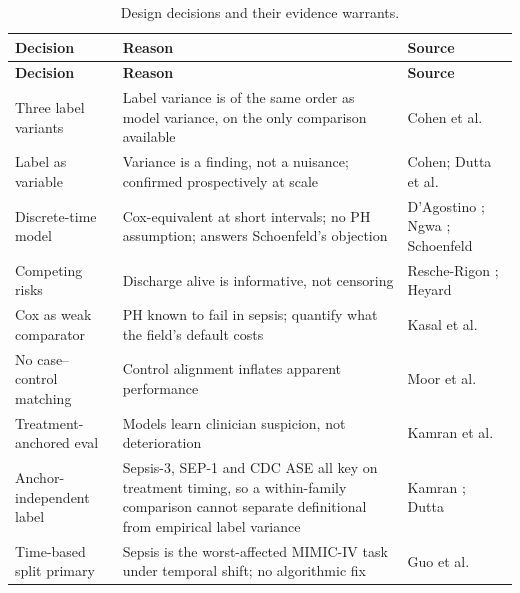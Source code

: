 {\small
\begin{longtable}{p{3.1cm}p{5.6cm}p{4cm}}
    \caption{Design decisions and their evidence warrants.}\label{tab:design_warrant}\\
    \toprule
    \textbf{Decision} & \textbf{Reason} & \textbf{Source} \\
    \midrule
    \endfirsthead
    \toprule
    \textbf{Decision} & \textbf{Reason} & \textbf{Source} \\
    \midrule
    \endhead
    \bottomrule
    \endfoot

        Three label variants & Label variance is of the same order as model
        variance, on the only comparison available &
        Cohen et al.\ \cite{cohen2024subtle} \\
        Label as variable & Variance is a finding, not a nuisance; confirmed
        prospectively at scale &
        Cohen; Dutta et al.\ \cite{dutta2026performance} \\
        Discrete-time model & Cox-equivalent at short intervals; no PH
        assumption; answers Schoenfeld's objection &
        D'Agostino \cite{dagostino1990pooled};
        Ngwa \cite{ngwa2016comparison};
        Schoenfeld \cite{schoenfeld2006survival} \\
        Competing risks & Discharge alive is informative, not censoring &
        Resche-Rigon \cite{rescherigon2006competing};
        Heyard \cite{heyard2019dynamic} \\
        Cox as weak comparator & PH known to fail in sepsis; quantify what the
        field's default costs &
        Kasal et al.\ \cite{kasal2004cox} \\
        No case--control matching & Control alignment inflates apparent
        performance &
        Moor et al.\ \cite{moor2021review} \\
        Treatment-anchored eval & Models learn clinician suspicion, not
        deterioration &
        Kamran et al.\ \cite{kamran2024evaluation} \\
        Anchor-independent label & Sepsis-3, SEP-1 and CDC ASE all key on
        treatment timing, so a within-family comparison cannot separate
        definitional from empirical label variance &
        Kamran \cite{kamran2024evaluation};
        Dutta \cite{dutta2026performance} \\
        Time-based split primary & Sepsis is the worst-affected MIMIC-IV task
        under temporal shift; no algorithmic fix &
        Guo et al.\ \cite{guo2022temporal} \\

\end{longtable}}
